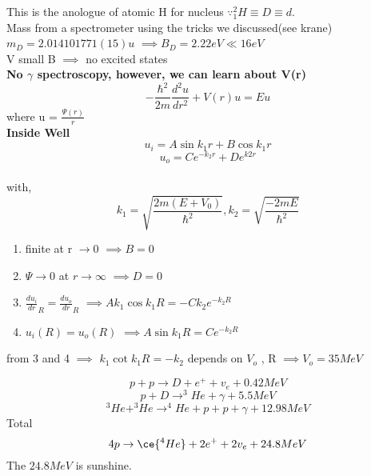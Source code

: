 This is the anologue of atomic H for nucleus \(\because ^2_1 H \equiv D\equiv d\).\\
Mass from a spectrometer using the tricks we discussed(see krane)\\
\(m_D = 2.014101771(15) u\) \(\implies  B_D = 2.22 eV \ll 16eV\)\\
V small B \(\implies \) no excited states \\
\textbf{No \(\gamma\) spectroscopy, however, we can learn about V(r) } 
\[
    -\frac{\hbar^2 }{2m} \frac{d^{2}u }{dr^2} + V(r)u = E u
\] where u = \(\frac{\Psi(r)}{r}\) \\
\textbf{Inside Well  } 
\[u_i = A \sin k_{1}r + B \cos  k_1 r \]
\[u_o = C e^{-k_2 r} + D e^{k2 r}\] \\
with,
\[
    k_1 = \sqrt{\frac{2m(E+V_0)}{\hbar^2}} ,  
    k_2 = \sqrt{\frac{-2mE}{\hbar^2}} 
\]

\begin{enumerate}
    \item finite at r \(\to  0 \) \(\implies B=0\) 
    \item \(\Psi \to 0\) at \(r\to \infty \)  \(\implies  D = 0\) 
    \item \(\frac{du_i}{dr}_R = \frac{du_o}{dr}_R\) \(\implies Ak_1\cos k_1 R = -C k_2 e^{-k_2R} \)  
    \item $u_i(R) = u_o(R)$ \(\implies  A \sin k_1 R = C e^{-k_2 R}\) 
\end{enumerate}
from 3 and 4 \(\implies \) \( k_1 \cot k_1 R = -k_2\) depends on $V_o$ , R \(\implies V_{o} = 35 MeV\) 

\[
    p + p \to D + e^+ +v_e + 0.42 MeV
\]
\[
    p + D \to ^{3}He + \gamma + 5.5 MeV
\]
\[
    ^3He + ^3He \to ^4He + p + p + \gamma + 12.98 MeV
\]
Total
\[
    4p \to \ce{^4He} + 2 e^+ + 2 v_e + 24.8 MeV
\]
The $ 24.8MeV$ is sunshine.